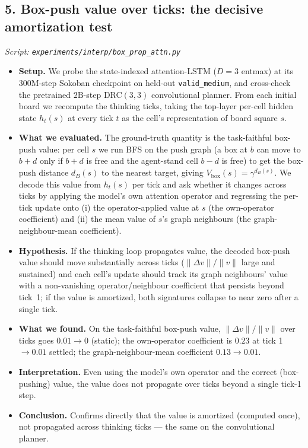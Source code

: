 \documentclass[11pt]{article}
\begin{document}
\subsection*{5. Box-push value over ticks: the decisive amortization test}
\textit{Script: \texttt{experiments/interp/box\_prop\_attn.py}}
\begin{itemize}
\item \textbf{Setup.} We probe the state-indexed attention-LSTM ($D=3$ entmax) at its $300\mathrm{M}$-step Sokoban checkpoint on held-out \texttt{valid\_medium}, and cross-check the pretrained $2\mathrm{B}$-step DRC$(3,3)$ convolutional planner. From each initial board we recompute the thinking ticks, taking the top-layer per-cell hidden state $h_t(s)$ at every tick $t$ as the cell's representation of board square $s$.
\item \textbf{What we evaluated.} The ground-truth quantity is the task-faithful box-push value: per cell $s$ we run BFS on the push graph (a box at $b$ can move to $b{+}d$ only if $b{+}d$ is free and the agent-stand cell $b{-}d$ is free) to get the box-push distance $d_B(s)$ to the nearest target, giving $V_{\mathrm{box}}(s)=\gamma^{d_B(s)}$. We decode this value from $h_t(s)$ per tick and ask whether it changes across ticks by applying the model's own attention operator and regressing the per-tick update onto (i) the operator-applied value at $s$ (the own-operator coefficient) and (ii) the mean value of $s$'s graph neighbours (the graph-neighbour-mean coefficient).
\item \textbf{Hypothesis.} If the thinking loop propagates value, the decoded box-push value should move substantially across ticks ($\lVert\Delta v\rVert/\lVert v\rVert$ large and sustained) and each cell's update should track its graph neighbours' value with a non-vanishing operator/neighbour coefficient that persists beyond tick~1; if the value is amortized, both signatures collapse to near zero after a single tick.
\item \textbf{What we found.} On the task-faithful box-push value, $\lVert\Delta v\rVert/\lVert v\rVert$ over ticks goes $0.01\to0$ (static); the own-operator coefficient is $0.23$ at tick 1 $\to0.01$ settled; the graph-neighbour-mean coefficient $0.13\to0.01$.
\item \textbf{Interpretation.} Even using the model's own operator and the correct (box-pushing) value, the value does not propagate over ticks beyond a single tick-1 step.
\item \textbf{Conclusion.} Confirms directly that the value is amortized (computed once), not propagated across thinking ticks --- the same on the convolutional planner.
\end{itemize}
\clearpage
\end{document}
